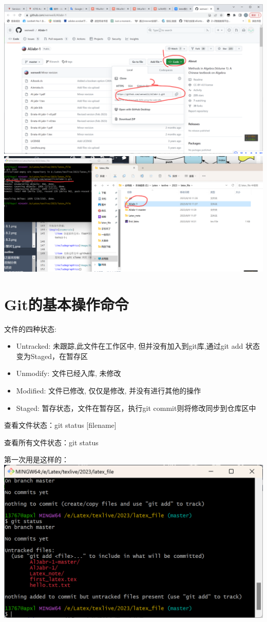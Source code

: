 \documentclass{article}
\begin{document}
\begin{enumerate}
    \includegraphics{image/8.3.jpg}
    \includegraphics{image/8.4.jpg}  
\end{enumerate}

\section{Git的基本操作命令}
文件的四种状态:
\begin{itemize}
    \item Untracked: 未跟踪,此文件在工作区中, 但并没有加入到git库,通过git add 状态变为Staged，在暂存区
    \item Unmodify: 文件已经入库, 未修改
    \item Modified: 文件已修改, 仅仅是修改, 并没有进行其他的操作
    \item Staged: 暂存状态，文件在暂存区，执行git commit则将修改同步到仓库区中
\end{itemize}
查看文件状态：git status [filename]

查看所有文件状态：git status

第一次用是这样的：
\includegraphics{image/9.1.png}
\end{document}
